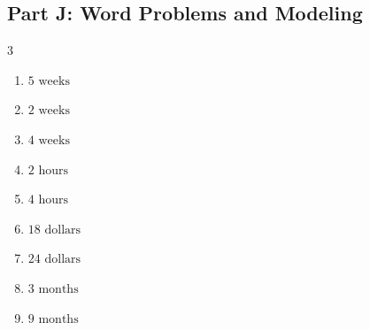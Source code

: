 \documentclass[11pt]{article}
\begin{document}
\subsection*{Part J: Word Problems and Modeling}
\begin{multicols}{3}
\begin{enumerate}
  \item $5\text{ weeks}$
  \item $2\text{ weeks}$
  \item $4\text{ weeks}$
  \item $2\text{ hours}$
  \item $4\text{ hours}$
  \item $18\text{ dollars}$
  \item $24\text{ dollars}$
  \item $3\text{ months}$
  \item $9\text{ months}$
\end{enumerate}
\end{multicols}
\end{document}
